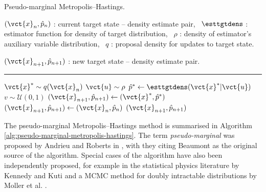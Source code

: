 \begin{algorithm}[!t]
\caption{Pseudo-marginal Metropolis--Hastings.}
\label{alg:pseudo-marginal-metropolis-hastings}
\begin{algorithmic}
\small
    \Require
    $(\vct{x}_n, \hat{p}_n)$ : current target state -- density estimate pair,~
    $\esttgtdens$ : estimator function for density of target distribution,~
    $\rho$ : density of estimator's auxiliary variable distribution,~
    $q$ : proposal density for updates to target state.
    \Ensure\raggedright
    $(\vct{x}_{n+1}, \hat{p}_{n+1})$ : new target state -- density estimate pair.
\end{algorithmic}
\hrule
\small
\begin{algorithmic}[1]
  \State $\vct{x}^* \sim q(\vct{x}_n)$ 
  \State $\vct{u} \sim \rho$\label{ln:density-estimate-1}
  \State $\hat{p}^* \gets \esttgtdens(\vct{x}^*|\vct{u})$ \label{ln:density-estimate-2} 
  \State $v \sim \mathcal{U}(0,1)$
    \State $(\vct{x}_{n+1},\hat{p}_{n+1}) \gets (\vct{x}^*,\hat{p}^*)$ 
  \Else
    \State  $ (\vct{x}_{n+1},\hat{p}_{n+1}) \gets (\vct{x}_n,\hat{p}_n)$ 
  \EndIf
  \State \Return $(\vct{x}_{n+1},\hat{p}_{n+1})$
\end{algorithmic}
\end{algorithm}

The pseudo-marginal Metropolis--Hastings method is summarised in Algorithm \ref{alg:pseudo-marginal-metropolis-hastings}. The term \emph{pseudo-marginal} was proposed by Andrieu and Roberts in \citep{andrieu2009pseudo}, with they citing Beaumont \citep{beaumont2003estimation} as the original source of the algorithm. Special cases of the algorithm have also been independently proposed, for example in the statistical physics literature by Kennedy and Kuti \citep{kennedy1985noise} and a \ac{MCMC} method for doubly intractable distributions by Moller et al. \citep{moller2006efficient}.

